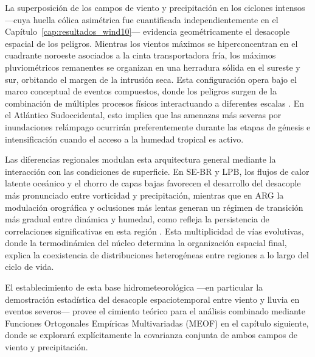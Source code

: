 La superposición de los campos de viento y precipitación en los ciclones intensos —cuya huella eólica asimétrica fue cuantificada independientemente en el Capítulo~\ref{cap:resultados_wind10}— evidencia geométricamente el desacople espacial de los peligros. 
Mientras los vientos máximos se hiperconcentran en el cuadrante noroeste asociados a la cinta transportadora fría, los máximos pluviométricos remanentes se organizan en una herradura sólida en el sureste y sur, orbitando el margen de la intrusión seca. 
Esta configuración opera bajo el marco conceptual de eventos compuestos, donde los peligros surgen de la combinación de múltiples procesos físicos interactuando a diferentes escalas \citep{zscheischler2018future}. 
En el Atlántico Sudoccidental, esto implica que las amenazas más severas por inundaciones relámpago ocurrirán preferentemente durante las etapas de génesis e intensificación cuando el acceso a la humedad tropical es activo.

Las diferencias regionales modulan esta arquitectura general mediante la interacción con las condiciones de superficie. 
En SE-BR y LPB, los flujos de calor latente oceánico y el chorro de capas bajas favorecen el desarrollo del desacople más pronunciado entre vorticidad y precipitación, mientras que en ARG la modulación orográfica y oclusiones más lentas generan un régimen de transición más gradual entre dinámica y humedad, como refleja la persistencia de correlaciones significativas en esta región \citep{marrafon2022classificacao}. 
Esta multiplicidad de vías evolutivas, donde la termodinámica del núcleo determina la organización espacial final, explica la coexistencia de distribuciones heterogéneas entre regiones a lo largo del ciclo de vida.

El establecimiento de esta base hidrometeorológica —en particular la demostración estadística del desacople espaciotemporal entre viento y lluvia en eventos severos— provee el cimiento teórico para el análisis combinado mediante Funciones Ortogonales Empíricas Multivariadas (MEOF) en el capítulo siguiente, donde se explorará explícitamente la covarianza conjunta de ambos campos de viento y precipitación.
